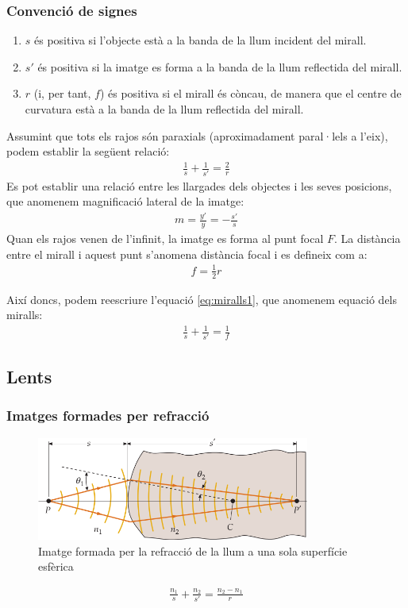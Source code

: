 \subsubsection*{Convenció de signes}
\begin{enumerate}
    \item $s$ és positiva si l'objecte està a la banda de la llum incident del mirall.
    \item $s'$ és positiva si la imatge es forma a la banda de la llum reflectida del mirall.
    \item $r$ (i, per tant, $f$) és positiva si el mirall és còncau, de manera que el centre de curvatura està a la banda de la llum reflectida del mirall.
\end{enumerate}
Assumint que tots els rajos són paraxials (aproximadament paral·lels a l'eix), podem establir la següent relació:
\begin{align}
    \boxed{\frac{1}{s} + \frac{1}{s'} = \frac{2}{r}} \label{eq:miralls1}
\end{align}
Es pot establir una relació entre les llargades dels objectes i les seves posicions, que anomenem magnificació lateral de la imatge:
\begin{align}
    \boxed{m = \frac{y'}{y} = - \frac{s'}{s}}
\end{align}
Quan els rajos venen de l'infinit, la imatge es forma al punt focal $F$. La distància entre el mirall i aquest punt s'anomena distància focal i es defineix com a:
\begin{align}
    \boxed{f = \frac{1}{2} r}
\end{align}

Així doncs, podem reescriure l'equació \ref{eq:miralls1}, que anomenem equació dels miralls:
\begin{align}
    \boxed{\frac{1}{s} + \frac{1}{s'} = \frac{1}{f}} \label{eq:miralls2}
\end{align}

\subsection{Lents}
\subsubsection*{Imatges formades per refracció}
\begin{figure}[H]
\centering
    \includegraphics[width=0.8\textwidth]{images/4/43-refraccio.png}
\caption{Imatge formada per la refracció de la llum a una sola superfície esfèrica}
\end{figure}
\begin{align}
    \boxed{\frac{n_{1}}{s} + \frac{n_{2}}{s'} = \frac{n_{2} - n_{1}}{r}}
\end{align}
